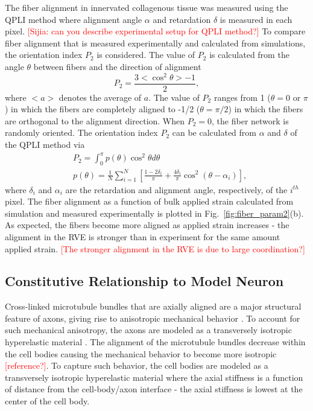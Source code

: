\documentclass[10pt]{asme2ej}
\begin{document}
The fiber alignment in innervated collagenous tissue was measured using the QPLI method \cite{Quinn:2009bf} where alignment angle $\alpha$ and retardation $\delta$ is measured in each pixel. \textcolor{red}{[Sijia: can you describe experimental setup for QPLI method?]} To compare fiber alignment that is measured experimentally and calculated from simulations, the orientation index $P_2$ is considered. The value of $P_2$ is calculated from the angle $\theta$ between fibers and the direction of alignment
%
\begin{equation}
P_2 = \frac{3 <\cos^2\theta> - 1}{2},
\label{eq:P2_simulation}
\end{equation}
%
where $<a>$ denotes the average of $a$. The value of $P_2$ ranges from 1 ($\theta=0$ or $\pi$) in which the fibers are completely aligned to -1/2 ($\theta=\pi/2$) in which the fibers are orthogonal to the alignment direction. When $P_2=0$, the fiber network is randomly oriented. The orientation index $P_2$ can be calculated from $\alpha$ and $\delta$ of the QPLI method via
%
\begin{align}
&P_2 = \int_0^{\pi} p(\theta) \cos^2\theta d\theta \nonumber\\
&p(\theta) = \frac{1}{N} \sum_{i=1}^N \left[ \frac{1-2\delta_i}{\pi} + \frac{4 \delta_i}{\pi}\cos^2(\theta - \alpha_i)\right],
\label{eq:P2_experiment}
\end{align}
%
where $\delta_i$ and $\alpha_i$ are the retardation and alignment angle, respectively, of the $i^{th}$ pixel. The fiber alignment as a function of bulk applied strain calculated from simulation and measured experimentally is plotted in Fig.\ \ref{fig:fiber_param2}(b). As expected, the fibers become more aligned as applied strain increases - the alignment in the RVE is stronger than in experiment for the same amount applied strain. \textcolor{red}{[The stronger alignment in the RVE is due to large coordination?]}

\subsection{Constitutive Relationship to Model Neuron}
Cross-linked microtubule bundles that are axially aligned are a major structural feature of axons, giving rise to anisotropic mechanical behavior \cite{Peter:2012fc}. To account for such mechanical anisotropy, the axons are modeled as a transversely isotropic hyperelastic material \cite{JavierBonet:2008uxa,Bonet:1998vc}. The alignment of the microtubule bundles decrease within the cell bodies causing the mechanical behavior to become more isotropic \textcolor{red}{[reference?]}. To capture such behavior, the cell bodies are modeled as a transversely isotropic hyperelastic material where the axial stiffness is a function of distance from the cell-body/axon interface - the axial stiffness is lowest at the center of the cell body. 
\end{document}
